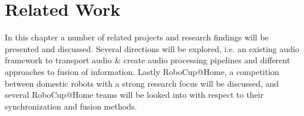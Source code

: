 
\chapter{Related Work}

In this chapter a number of related projects and research findings will be presented and discussed. 
Several directions will be explored, i.e. an existing audio framework to transport audio \& create audio processing pipelines and different approaches to fusion of information.
Lastly RoboCup@Home, a competition between domestic robots with a strong research focus will be discussed, and several RoboCup@Home teams will be looked into with respect to their synchronization and fusion methods.



